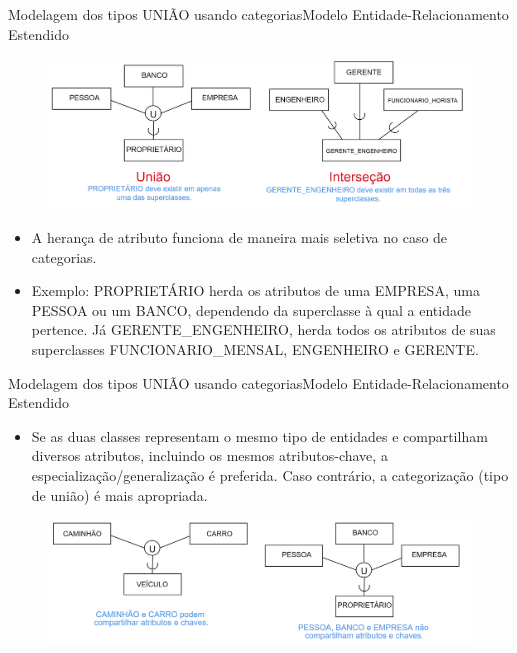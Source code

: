 \documentclass[t]{beamer}
\begin{document}
\begin{ftst}{Modelagem dos tipos UNIÃO usando categorias}{Modelo Entidade-Relacionamento Estendido}
\begin{figure}
    \centering
    \includegraphics[scale=0.12]{Figuras/02_05.png}
\end{figure}
\footnotesize
\begin{itemize}
    \item A herança de atributo funciona de maneira mais seletiva no caso de categorias. 
    \item Exemplo: PROPRIETÁRIO herda os atributos de uma EMPRESA, uma PESSOA ou um BANCO, dependendo da superclasse à qual a entidade pertence. Já GERENTE\_ENGENHEIRO, herda todos os atributos de suas superclasses FUNCIONARIO\_MENSAL, ENGENHEIRO e GERENTE.
\end{itemize}
\end{ftst}


\begin{ftst}{Modelagem dos tipos UNIÃO usando categorias}{Modelo Entidade-Relacionamento Estendido}
\begin{itemize}
    \item Se as duas classes representam o mesmo tipo de entidades e compartilham diversos atributos, incluindo os mesmos atributos-chave, a especialização/generalização é preferida. Caso contrário, a categorização (tipo de união) é mais apropriada.
\end{itemize}
\vone
\begin{figure}
    \centering
    \includegraphics[scale=0.12]{Figuras/02_06.png}
\end{figure}
\end{ftst}
\end{document}
